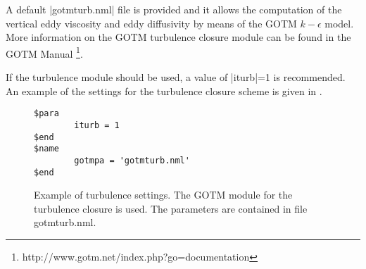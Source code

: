 A default |gotmturb.nml| file is provided and it allows the
computation of the vertical eddy viscosity and eddy diffusivity by
means of the GOTM  $k-\epsilon$ model.  More information on the
GOTM turbulence closure module can be found in the GOTM Manual
\footnote{http://www.gotm.net/index.php?go=documentation}.

If the turbulence module should be used, a value of |iturb|=1 is
recommended.  An example of the settings for the turbulence closure
scheme is given in \Fig{}.

\begin{figure}[ht]
\begin{verbatim}
$para
        iturb = 1
$end
$name
        gotmpa = 'gotmturb.nml'
$end
\end{verbatim}
\caption{Example of turbulence settings. The GOTM module for the
turbulence closure is used. The parameters are contained in file
gotmturb.nml.}
\label{fig:turbulence}
\end{figure}

